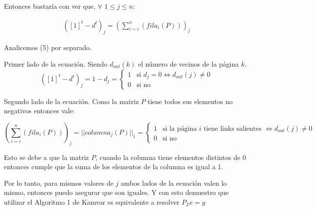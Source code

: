 Entonces bastar\'ia con ver que, $\forall$ $ 1 \leq j \leq n$:

\begin{align}
	([1]^{t} -d^{t})_{j} = \left(\sum_{i=i}^{n}(fila_{i}(P))\right)_{j}
\end{align}

Analicemos (5) por separado.

Primer lado de la ecuaci\'on. Siendo $d_{out}(k)$ el n\'umero de vecinos de la p\'agina $k$.
\[
	([1]^{t} -d^{t})_{j} = 
	1 - d_{j} = 
	\begin{cases}
		1 & \text{si }d_{j} = 0 \iff d_{out}(j) \neq 0 \\
		0 & \text{si no}
	\end{cases}
\]

Segundo lado de la ecuaci\'on. Como la matriz $P$ tiene todos sus elementos no negativos entonces vale:

\[
	\left(\sum_{i=i}^{n}(fila_{i}(P))\right)_{j} = ||columna_{j}(P)||_{1} =
		\begin{cases}
		1 & \text{si la p\'agina $i$ tiene links salientes } \iff d_{out}(j) \neq 0 \\
		0 & \text{si no}
	\end{cases}
\]

Esto se debe a que la matriz $P$, cuando la columna tiene elementos distintos de 0 entonces cumple que la suma de los elementos de la columna es igual a 1.

Por lo tanto, para mismos valores de $j$ ambos lados de la ecuaci\'on valen lo mismo, entonces puedo asegurar que son iguales. Y con esto demuestro que utilizar el Algoritmo 1 de Kamvar es equivalente a resolver $P_{2}x = y$

